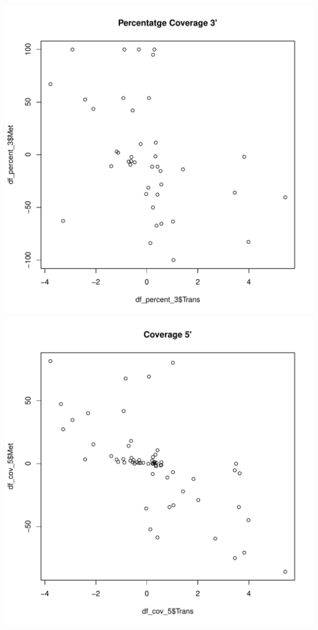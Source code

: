 \documentclass{article}\usepackage[]{graphicx}\usepackage[]{color}
\makeatletter
\def\maxwidth{ %
  \ifdim\Gin@nat@width>\linewidth
    \linewidth
  \else
    \Gin@nat@width
  \fi
}
\newenvironment{knitrout}{}{} %
\makeatother
\begin{document}
\begin{knitrout}
{\includegraphics[width=\maxwidth]{figure/minimal-correlacions_met-3} 
\includegraphics[width=\maxwidth]{figure/minimal-correlacions_met-4} 
}
\end{knitrout}
\end{document}
